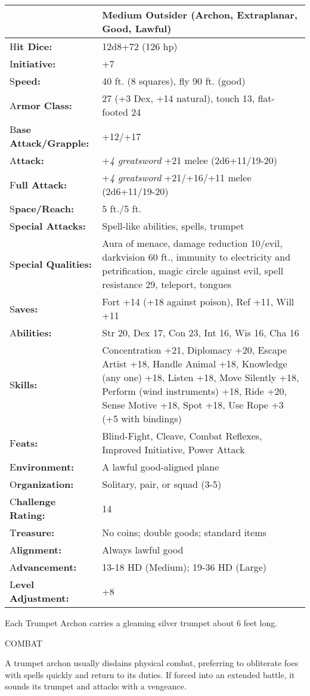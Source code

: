 \documentclass{article}
\begin{document}
\begin{tabular}{|>{\raggedright}p{91pt}|>{\raggedright}p{231pt}|}
\hline
  & Medium Outsider (Archon, Extraplanar, Good, Lawful)\tabularnewline
\hline
H\textbf{it Dice:} & 12d8+72 (126 hp)\tabularnewline
\hline
I\textbf{nitiative:} & +7\tabularnewline
\hline
S\textbf{peed:} & 40 ft. (8 squares), fly 90 ft. (good)\tabularnewline
\hline
A\textbf{rmor Class:} & 27 (+3 Dex, +14 natural), touch 13, flat-footed 24\tabularnewline
\hline
B\textbf{ase Attack/Grapple:} & +12/+17\tabularnewline
\hline
A\textbf{ttack:} & +\textit{4 greatsword }+21 melee (2d6+11/19-20)\tabularnewline
\hline
F\textbf{ull Attack:} & +\textit{4 greatsword }+21/+16/+11 melee (2d6+11/19-20)\tabularnewline
\hline
S\textbf{pace/Reach:} & 5 ft./5 ft.\tabularnewline
\hline
S\textbf{pecial Attacks:} & Spell-like abilities, spells, trumpet\tabularnewline
\hline
S\textbf{pecial Qualities:} & Aura of menace, damage reduction 10/evil, darkvision 
60 ft., immunity to electricity and petrification, magic circle against evil, spell 
resistance 29, teleport, tongues\tabularnewline
\hline
S\textbf{aves:} & Fort +14 (+18 against poison), Ref +11, Will +11\tabularnewline
\hline
A\textbf{bilities:} & Str 20, Dex 17, Con 23, Int 16, Wis 16, Cha 16\tabularnewline
\hline
S\textbf{kills:} & Concentration +21, Diplomacy +20, Escape Artist +18, Handle 
Animal +18, Knowledge (any one) +18, Listen +18, Move Silently +18, Perform (wind 
instruments) +18, Ride +20, Sense Motive +18, Spot +18, Use Rope +3 (+5 with bindings)\tabularnewline
\hline
F\textbf{eats:} & Blind-Fight, Cleave, Combat Reflexes, Improved Initiative, Power 
Attack\tabularnewline
\hline
E\textbf{nvironment:} & A lawful good-aligned plane\tabularnewline
\hline
O\textbf{rganization:} & Solitary, pair, or squad (3-5)\tabularnewline
\hline
C\textbf{hallenge Rating:} & 14\tabularnewline
\hline
T\textbf{reasure:} & No coins; double goods; standard items\tabularnewline
\hline
A\textbf{lignment:} & Always lawful good\tabularnewline
\hline
A\textbf{dvancement:} & 13-18 HD (Medium); 19-36 HD (Large)\tabularnewline
\hline
L\textbf{evel Adjustment:} & +8\tabularnewline
\hline
\end{tabular}

Each Trumpet Archon carries a gleaming silver trumpet about 6 feet long.

COMBAT

A trumpet archon usually disdains physical combat, preferring to obliterate foes 
with spells quickly and return to its duties. If forced into an extended battle, 
it sounds its trumpet and attacks with a vengeance.
\end{document}
